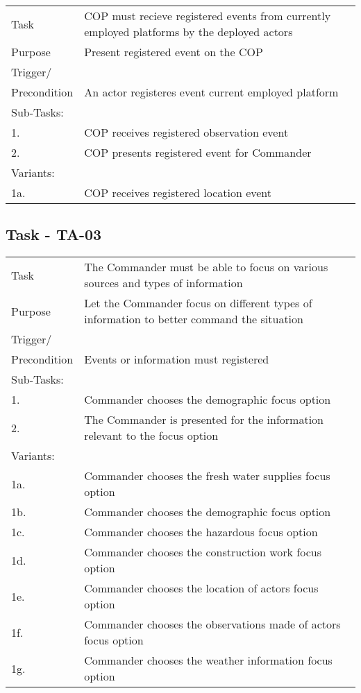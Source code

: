 \begin{longtable}{| p{2.5cm}  | p{10cm} |  }
	\hline
	Task & COP must recieve registered events from currently employed platforms by the deployed actors  \\
	Purpose & Present registered event on the COP \\
	Trigger/ &  \\ Precondition & An actor registeres event current employed platform \\
	\hline
	Sub-Tasks: & \\
	1. & COP receives registered observation event \\
	2. & COP presents registered event for Commander \\
	\hline
	Variants: & \\
	1a. & COP receives registered location event \\
	\hline
\end{longtable}

\subsection{Task - TA-03}
\begin{longtable}{| p{2.5cm}  | p{10cm} |  }
	\hline
	Task & The Commander must be able to focus on various sources and types of information  \\
	Purpose & Let the Commander focus on different types of information to better command the situation \\
	Trigger/ &  \\ Precondition & Events or information must registered \\
	\hline
	Sub-Tasks: & \\
	1. & Commander chooses the demographic focus option \\
	2. & The Commander is presented for the information relevant to the focus option \\
	\hline
	Variants: & \\
	1a. & Commander chooses the fresh water supplies focus option  \\
	1b. & Commander chooses the demographic focus option  \\
	1c. & Commander chooses the hazardous focus option  \\
	1d. & Commander chooses the construction work focus option  \\
	1e. & Commander chooses the location of actors focus option  \\
	1f. & Commander chooses the observations made of actors focus option \\
	1g. & Commander chooses the weather information focus option  \\
	\hline
\end{longtable}

